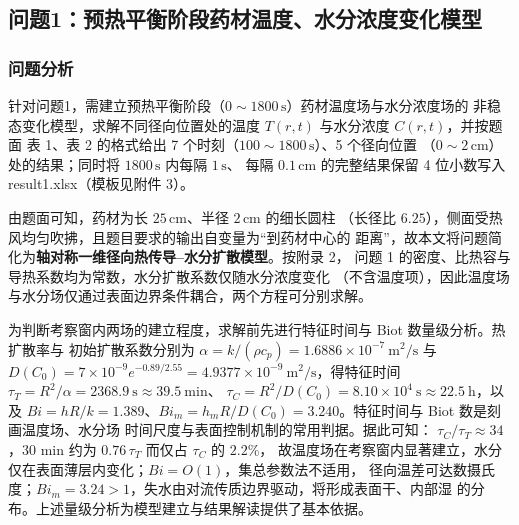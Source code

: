 \subsection{问题1：预热平衡阶段药材温度、水分浓度变化模型}

\subsubsection{问题分析}

针对问题1，需建立预热平衡阶段（$0\sim1800\,\mathrm{s}$）药材温度场与水分浓度场的
非稳态变化模型，求解不同径向位置处的温度 $T(r,t)$ 与水分浓度 $C(r,t)$，并按题面
表 1、表 2 的格式给出 7 个时刻（$100\sim1800\,\mathrm{s}$）、5 个径向位置
（$0\sim2\,\mathrm{cm}$）处的结果；同时将 $1800\,\mathrm{s}$ 内每隔 $1\,\mathrm{s}$、
每隔 $0.1\,\mathrm{cm}$ 的完整结果保留 4 位小数写入 result1.xlsx（模板见附件 3）。

由题面可知，药材为长 $25\,\mathrm{cm}$、半径 $2\,\mathrm{cm}$ 的细长圆柱
（长径比 $6.25$），侧面受热风均匀吹拂，且题目要求的输出自变量为“到药材中心的
距离”，故本文将问题简化为\textbf{轴对称一维径向热传导--水分扩散模型}。按附录 2，
问题 1 的密度、比热容与导热系数均为常数，水分扩散系数仅随水分浓度变化
（不含温度项），因此温度场与水分场仅通过表面边界条件耦合，两个方程可分别求解。

为判断考察窗内两场的建立程度，求解前先进行特征时间与 Biot 数量级分析。热扩散率与
初始扩散系数分别为 $\alpha=k/(\rho c_p)=1.6886\times10^{-7}\ \mathrm{m^2/s}$ 与
$D(C_0)=7\times10^{-9}e^{-0.89/2.55}=4.9377\times10^{-9}\ \mathrm{m^2/s}$，得特征时间
$\tau_T=R^2/\alpha=2368.9\ \mathrm{s}\approx39.5\ \mathrm{min}$、
$\tau_C=R^2/D(C_0)=8.10\times10^{4}\ \mathrm{s}\approx22.5\ \mathrm{h}$，以及
$Bi=hR/k=1.389$、$Bi_m=h_mR/D(C_0)=3.240$。特征时间与 Biot 数是刻画温度场、水分场
时间尺度与表面控制机制的常用判据\cite{yan2026heat,srikiatden2007moisture}。据此可知：
$\tau_C/\tau_T\approx34$，30 min 约为 $0.76\,\tau_T$ 而仅占 $\tau_C$ 的 $2.2\%$，
故温度场在考察窗内显著建立，水分仅在表面薄层内变化；$Bi=O(1)$，集总参数法不适用，
径向温差可达数摄氏度；$Bi_m=3.24>1$，失水由对流传质边界驱动，将形成表面干、内部湿
的分布。上述量级分析为模型建立与结果解读提供了基本依据。

